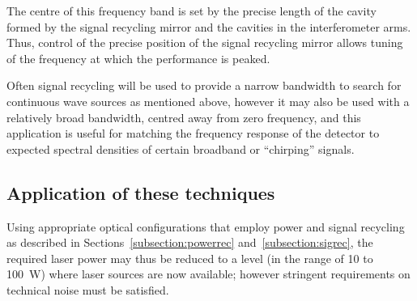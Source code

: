 \documentclass{article}
\begin{document}

The centre of this frequency band is set by the precise length of the cavity
formed by the signal recycling mirror and the cavities in the interferometer
arms. Thus, control of the precise position of the signal recycling mirror allows
tuning of the frequency at which the performance is peaked.

Often signal recycling will be used to provide a narrow bandwidth to search for
continuous wave sources as mentioned above, however it may also be used with a
relatively broad bandwidth, centred away from zero frequency, and this
application is useful for matching the frequency response of the detector to
expected spectral densities of certain broadband or ``chirping'' signals.



\subsection{Application of these techniques}
\label{subsection:application}

Using appropriate optical configurations that employ power and signal recycling
as described in Sections~\ref{subsection:powerrec} and~\ref{subsection:sigrec}, the required laser power may thus be reduced
to a level (in the range of 10 to 100~W) where laser sources are now available;
however stringent requirements on technical noise must be satisfied.

\end{document}

